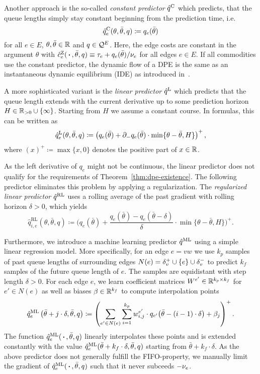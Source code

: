 Another approach is the so-called \emph{constant predictor} $\hat q^{\text{C}}$ which predicts, that the queue lengths simply stay constant beginning from the prediction time, i.e.
\[
    \hat q^{\text{C}}_{e}(\theta, \bar\theta, q) \coloneqq q_e(\bar\theta)
\]
for all $e\in E$, $\theta,\bar\theta\in\mathbb{R}$ and $q\in \mathcal{Q}^E$.
Here, the edge costs are constant in the argument $\theta$ with $\hat c^{\text{Z}}_e(\,\boldsymbol{\cdot}\,, \bar\theta, q)\equiv \tau_e + q_e(\bar\theta)/\nu_e$ for all edges $e\in E$.
If all commodities use the constant predictor, the dynamic flow of a DPE is the same as an instantaneous dynamic equilibrium (IDE) as introduced in~\cite[Definition~2.1]{Graf2020}.

A more sophisticated variant is the \emph{linear predictor} $\hat q^{\text{L}}$ which predicts that the queue length extends with the current derivative up to some prediction horizon $H\in \mathbb{R}_{>0} \cup \{ \infty \}$.
Starting from $H$ we assume a constant course.
In formulas, this can be written as \[
    \hat q^{\text{L}}_e(\theta,\bar\theta,q) \coloneqq \left( q_e(\bar\theta) + \partial_- q_e(\bar\theta) \cdot \min\{\theta - \bar\theta, H \} \right)^+,
\]
where $(x)^+\coloneqq \max\{ x, 0 \}$ denotes the positive part of $x\in\mathbb{R}$.

As the left derivative of $q_e$ might not be continuous, the linear predictor does not qualify for the requirements of Theorem~\ref{thm:dpe-existence}.
The following predictor eliminates this problem by applying a regularization.
The \emph{regularized linear predictor} $\hat q^{\text{RL}}$ uses a rolling average of the past gradient with rolling horizon $\delta>0$, which yields
\[
\hat q_{i,e}^{\text{RL}}(\theta, \bar\theta, q) \coloneqq
  \Big( q_e(\bar\theta) + \frac{q_e(\bar\theta) - q_e(\bar\theta - \delta)}{\delta} \cdot \min\{ \theta - \bar\theta, H \} \Big)^+.
\]

Furthermore, we introduce a machine learning predictor $\hat q^{\text{ML}}$ using a simple linear regression model.
More specifically, for an edge $e=vw$ we use $k_p$ samples of past queue lengths of surrounding edges $N(e) = \delta^+_{v} \cup \{ e \} \cup\delta^-_{v}$ to predict $k_f$ samples of the future queue length of $e$.
The samples are equidistant with step length $\delta > 0$.
For each edge $e$, we learn coefficient matrices $W^{e'}\in\mathbb{R}^{k_p\times k_f}$ for $e'\in N(e)$ as well as biases $\beta\in\mathbb{R}^{k_f}$ to compute interpolation points \[
    \hat q^{\text{ML}}_e\left(\bar\theta + j\cdot\delta,\bar\theta,q \right) \coloneqq 
    \left(
    \sum_{e'\in N(e)} \sum_{i = 1}^{k_p} w^{e'}_{i, j} \cdot {q_{e'}}{\left( 
        \bar\theta - (i-1)\cdot\delta
    \right)}
    + \beta_j
    \right)^+.
\]
The function $\hat q^{\text{ML}}_e(\,\boldsymbol{\cdot}\,, \bar\theta, q)$ linearly interpolates these points and is extended constantly with the value $\hat q^{\text{ML}}_e(\bar\theta + k_f\cdot\delta,\bar\theta,q )$ starting from $\bar\theta + k_f\cdot \delta$.
As the above predictor does not generally fulfill the FIFO-property, we manually limit the gradient of $\hat q^{\text{ML}}_e(\,\boldsymbol{\cdot}\,, \bar\theta, q)$ such that it never subceeds $-\nu_e$.

